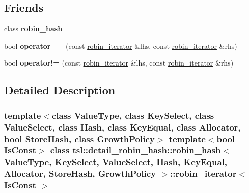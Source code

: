 \subsection*{Friends}
\begin{DoxyCompactItemize}
\item 
\mbox{\label{classtsl_1_1detail__robin__hash_1_1robin__hash_1_1robin__iterator_a67236abe71c4d039824d9e52c78d3bae}} 
class {\bfseries robin\+\_\+hash}
\item 
\mbox{\label{classtsl_1_1detail__robin__hash_1_1robin__hash_1_1robin__iterator_afbd8032f2baeae1c26d7a5efd78549c8}} 
bool {\bfseries operator==} (const \mbox{\hyperlink{classtsl_1_1detail__robin__hash_1_1robin__hash_1_1robin__iterator}{robin\+\_\+iterator}} \&lhs, const \mbox{\hyperlink{classtsl_1_1detail__robin__hash_1_1robin__hash_1_1robin__iterator}{robin\+\_\+iterator}} \&rhs)
\item 
\mbox{\label{classtsl_1_1detail__robin__hash_1_1robin__hash_1_1robin__iterator_a89ed5c170efa7bfdc6d6af412198361f}} 
bool {\bfseries operator!=} (const \mbox{\hyperlink{classtsl_1_1detail__robin__hash_1_1robin__hash_1_1robin__iterator}{robin\+\_\+iterator}} \&lhs, const \mbox{\hyperlink{classtsl_1_1detail__robin__hash_1_1robin__hash_1_1robin__iterator}{robin\+\_\+iterator}} \&rhs)
\end{DoxyCompactItemize}


\subsection{Detailed Description}
\subsubsection*{template$<$class Value\+Type, class Key\+Select, class Value\+Select, class Hash, class Key\+Equal, class Allocator, bool Store\+Hash, class Growth\+Policy$>$\newline
template$<$bool Is\+Const$>$\newline
class tsl\+::detail\+\_\+robin\+\_\+hash\+::robin\+\_\+hash$<$ Value\+Type, Key\+Select, Value\+Select, Hash, Key\+Equal, Allocator, Store\+Hash, Growth\+Policy $>$\+::robin\+\_\+iterator$<$ Is\+Const $>$}

